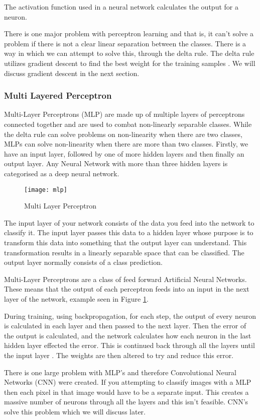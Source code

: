 The activation function used in a neural network calculates the output for a neuron.

There is one major problem with perceptron learning and that is, it can't solve
a problem if there is not a clear linear separation between the classes. There
is a way in which we can attempt to solve this, through the delta rule. The
delta rule utilizes gradient descent to find the best weight for the training
samples \parencite{MLANN}. We will discuss gradient descent in the next section.

\subsubsection*{Multi Layered Perceptron}
Multi-Layer Perceptrons (MLP) are made up of multiple layers of perceptrons connected
together and are used to combat non-linearly separable classes.
While the delta rule can solve problems on non-linearity when there are two classes, MLPs can solve non-linearity when there are more than two classes.
Firstly, we have an input layer, followed by one of more hidden layers and then
finally an output layer.
Any Neural Network with more than three hidden layers is categorised as a deep neural network.

\begin{figure}[h]
	\centering
    \texttt{[image: mlp]}
    \caption{Multi Layer Perceptron}
    \label{fig:mlp}
\end{figure}

The input layer of your network consists of the data you feed into the network to classify it. The input layer passes this data to a hidden layer
whose purpose is to transform this data into something that the output layer can
understand. This transformation results in a linearly separable space that can be classified. The output layer normally consists of a class prediction.

Multi-Layer Perceptrons are a class of feed forward Artificial Neural Networks.
These means that the output of each perceptron feeds into an input in the next
layer of the network, example seen in Figure \ref{fig:mlp}.

During training, using backpropagation, for each step, the output of every neuron is calculated in each layer and then passed to the next layer. Then the error of the output is calculated, and the network calculates how each neuron in the last hidden layer effected the error. This is continued back through all the layers until the input layer \parencite{handsOnML}. The weights are then altered to try and reduce this error.

There is one large problem with MLP's and therefore Convolutional Neural
Networks (CNN) were created. If you attempting to classify images with a MLP then
each pixel in that image would have to be a separate input. This creates a
massive number of neurons through all the layers and this isn't feasible. CNN's
solve this problem which we will discuss later.


